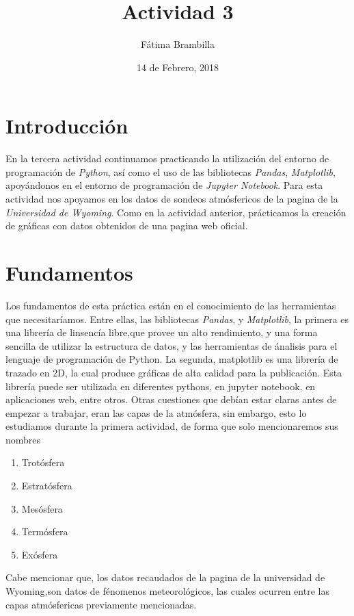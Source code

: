 \documentclass{article}
\title{Actividad 3}
\author{Fátima Brambilla}
\date{14 de Febrero, 2018}
\begin{document}
\maketitle

\section {Introducción}
En la tercera actividad continuamos practicando la utilización del entorno de programación de \textit{Python}, así como el uso de las bibliotecas \textit{Pandas}, \textit{Matplotlib}, apoyándonos en el entorno de programación de \textit{Jupyter Notebook}.
Para esta actividad nos apoyamos en los datos de sondeos atmósfericos de la pagina de la \textit{Universidad de Wyoming}. Como en la actividad anterior, prácticamos la creación de gráficas con datos obtenidos de una pagina web oficial.

\section {Fundamentos}
Los fundamentos de esta práctica están en el conocimiento de las herramientas que necesitaríamos. Entre ellas, las bibliotecas \textit{Pandas}, y \textit{Matplotlib}, la primera es una librería de linsencía libre,que provee un alto rendimiento, y  una forma sencilla de utilizar la estructura de datos, y las herramientas de ánalisis para el lenguaje de programación de Python. La segunda, matplotlib es una librería de trazado en 2D, la cual produce gráficas de alta calidad para la publicación. Esta librería puede ser utilizada en diferentes pythons, en jupyter notebook, en aplicaciones web, entre otros.
Otras cuestiones que debían estar claras antes de empezar a trabajar, eran las capas de la atmósfera, sin embargo, esto lo estudiamos durante la primera actividad, de forma que solo mencionaremos sus nombres
\begin{enumerate}
\item Trotósfera
\item Estratósfera
\item Mesósfera
\item Termósfera
\item Exósfera
\end{enumerate}
Cabe mencionar que, los datos recaudados de la pagina de la universidad de Wyoming,son datos de fénomenos meteorológicos, las cuales ocurren entre las capas atmósfericas previamente mencionadas.
\end{document}
